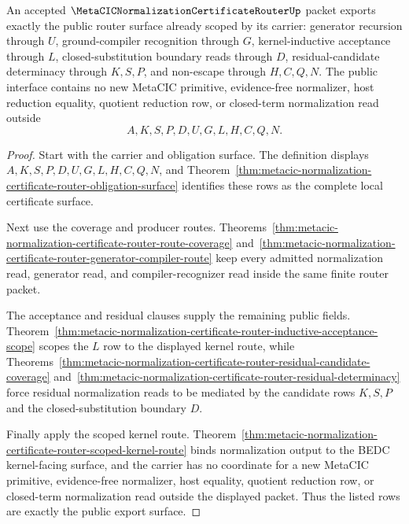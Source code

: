 \begin{theorem}
\label{thm:metacic-normalization-certificate-router-public-export}
An accepted $\MetaCICNormalizationCertificateRouterUp$ packet exports exactly the public router surface already scoped by its carrier: generator recursion through $U$, ground-compiler recognition through $G$, kernel-inductive acceptance through $L$, closed-substitution boundary reads through $D$, residual-candidate determinacy through $K,S,P$, and non-escape through $H,C,Q,N$. The public interface contains no new MetaCIC primitive, evidence-free normalizer, host reduction equality, quotient reduction row, or closed-term normalization read outside
$$
A,K,S,P,D,U,G,L,H,C,Q,N .
$$
\end{theorem}
\begin{proof}
Start with the carrier and obligation surface. The definition displays $A,K,S,P,D,U,G,L,H,C,Q,N$, and Theorem~\ref{thm:metacic-normalization-certificate-router-obligation-surface} identifies these rows as the complete local certificate surface.

Next use the coverage and producer routes. Theorems~\ref{thm:metacic-normalization-certificate-router-route-coverage} and~\ref{thm:metacic-normalization-certificate-router-generator-compiler-route} keep every admitted normalization read, generator read, and compiler-recognizer read inside the same finite router packet.

The acceptance and residual clauses supply the remaining public fields. Theorem~\ref{thm:metacic-normalization-certificate-router-inductive-acceptance-scope} scopes the $L$ row to the displayed kernel route, while Theorems~\ref{thm:metacic-normalization-certificate-router-residual-candidate-coverage} and~\ref{thm:metacic-normalization-certificate-router-residual-determinacy} force residual normalization reads to be mediated by the candidate rows $K,S,P$ and the closed-substitution boundary $D$.

Finally apply the scoped kernel route. Theorem~\ref{thm:metacic-normalization-certificate-router-scoped-kernel-route} binds normalization output to the BEDC kernel-facing surface, and the carrier has no coordinate for a new MetaCIC primitive, evidence-free normalizer, host equality, quotient reduction row, or closed-term normalization read outside the displayed packet. Thus the listed rows are exactly the public export surface.
\end{proof}

